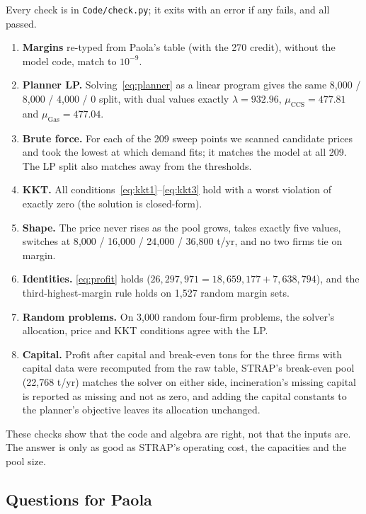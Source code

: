 \documentclass[11pt]{article}
\newcommand{\gas}{\mathrm{Gas}}
\newcommand{\ccs}{\mathrm{CCS}}
\begin{document}
Every check is in \texttt{Code/check.py}; it exits with an error if any fails, and
all passed.
\begin{enumerate}[leftmargin=1.6em,itemsep=0.15em]
  \item \textbf{Margins} re-typed from Paola's table (with the 270 credit), without
        the model code, match to $10^{-9}$.
  \item \textbf{Planner LP.} Solving~\eqref{eq:planner} as a linear program gives the
        same 8{,}000 / 8{,}000 / 4{,}000 / 0 split, with dual values exactly
        $\lambda=932.96$, $\mu_\ccs=477.81$ and $\mu_\gas=477.04$.
  \item \textbf{Brute force.} For each of the 209 sweep points we scanned candidate
        prices and took the lowest at which demand fits; it matches the model at all
        209. The LP split also matches away from the thresholds.
  \item \textbf{KKT.} All conditions~\eqref{eq:kkt1}--\eqref{eq:kkt3} hold with a
        worst violation of exactly zero (the solution is closed-form).
  \item \textbf{Shape.} The price never rises as the pool grows, takes exactly five
        values, switches at 8{,}000 / 16{,}000 / 24{,}000 / 36{,}800 t/yr, and no two
        firms tie on margin.
  \item \textbf{Identities.} \eqref{eq:profit} holds
        ($26{,}297{,}971=18{,}659{,}177+7{,}638{,}794$), and the third-highest-margin
        rule holds on 1{,}527 random margin sets.
  \item \textbf{Random problems.} On 3{,}000 random four-firm problems, the solver's
        allocation, price and KKT conditions agree with the LP.
  \item \textbf{Capital.} Profit after capital and break-even tons for the three
        firms with capital data were recomputed from the raw table, STRAP's break-even
        pool (22{,}768 t/yr) matches the solver on either side, incineration's missing
        capital is reported as missing and not as zero, and adding the capital
        constants to the planner's objective leaves its allocation unchanged.
\end{enumerate}
These checks show that the code and algebra are right, not that the inputs are. The
answer is only as good as STRAP's operating cost, the capacities and the pool size.

\subsection{Questions for Paola}
\label{sec:questions}
\end{document}
